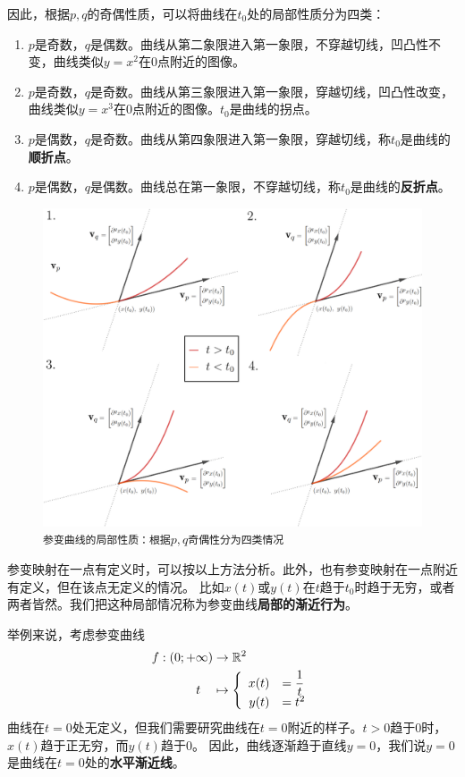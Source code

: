 \documentclass[12pt,UTF8]{ctexbook}
\begin{document}
因此，根据$p,q$的奇偶性质，可以将曲线在$t_0$处的局部性质分为四类：
\begin{enumerate}
    \item $p$是奇数，$q$是偶数。曲线从第二象限进入第一象限，不穿越切线，凹凸性不变，曲线类似$y = x^2$在$0$点附近的图像。
    \item $p$是奇数，$q$是奇数。曲线从第三象限进入第一象限，穿越切线，凹凸性改变，曲线类似$y = x^3$在$0$点附近的图像。$t_0$是曲线的拐点。
    \item $p$是偶数，$q$是奇数。曲线从第四象限进入第一象限，穿越切线，称$t_0$是曲线的\textbf{顺折点}。
    \item $p$是偶数，$q$是偶数。曲线总在第一象限，不穿越切线，称$t_0$是曲线的\textbf{反折点}。
\end{enumerate}

\begin{figure}[h] 
    \centering
    \includegraphics[width=\textwidth]{tu/参数曲线局部展开1.png}
    \caption*{\texttt{参变曲线的局部性质：根据$p,q$奇偶性分为四类情况}}
\end{figure}

参变映射在一点有定义时，可以按以上方法分析。此外，也有参变映射在一点附近有定义，但在该点无定义的情况。
比如$x(t)$或$y(t)$在$t$趋于$t_0$时趋于无穷，或者两者皆然。我们把这种局部情况称为参变曲线\textbf{局部的渐近行为}。

举例来说，考虑参变曲线
\begin{align*}
    f: (0; +\infty) &\rightarrow \mathbb{R}^2 \\
    t\quad &\mapsto\left\{
        \begin{array}[]{rl}
            x(t) &\displaystyle = \frac{1}{t} \\
            y(t) &= t^2\\
        \end{array}
    \right.
\end{align*}
曲线在$t=0$处无定义，但我们需要研究曲线在$t=0$附近的样子。$t>0$趋于$0$时，$x(t)$趋于正无穷，而$y(t)$趋于$0$。
因此，曲线逐渐趋于直线$y = 0$，我们说$y = 0$是曲线在$t=0$处的\textbf{水平渐近线}。
\end{document}
